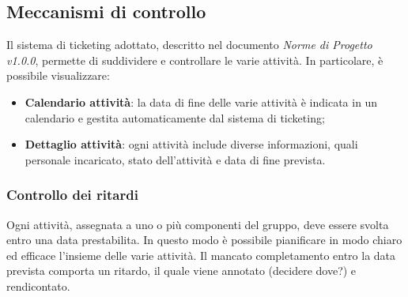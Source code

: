 \subsection{Meccanismi di controllo}
Il sistema di ticketing adottato, descritto nel documento \emph{Norme di Progetto v1.0.0}, permette di suddividere e controllare le varie attività. In particolare, è possibile visualizzare:
\begin{itemize}
\item{\textbf{Calendario attività}}: la data di fine delle varie attività è indicata in un calendario e gestita automaticamente dal sistema di ticketing;  
\item{\textbf{Dettaglio attività}}: ogni attività include diverse informazioni, quali personale incaricato, stato dell'attività e data di fine prevista. 
\end{itemize}
\subsubsection{Controllo dei ritardi}
Ogni attività, assegnata a uno o più componenti del gruppo, deve essere svolta entro una data prestabilita. In questo modo è possibile pianificare in modo chiaro ed efficace l'insieme delle varie attività. Il mancato completamento entro la data prevista comporta un ritardo, il quale viene annotato (decidere dove?) e rendicontato.

